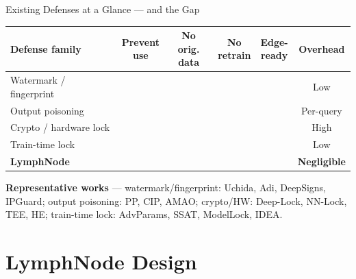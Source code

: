 \documentclass{beamer}
\newcommand{\smallgap}{\vspace{0.15cm}}
\newcommand{\cmark}{\textcolor{green!55!black}{\ding{51}}}
\newcommand{\xmark}{\textcolor{red!70!black}{\ding{55}}}
\begin{document}
\begin{frame}{Existing Defenses at a Glance --- and the Gap}
    \footnotesize
    \begin{center}
    \setlength{\tabcolsep}{6pt}\renewcommand{\arraystretch}{1.35}
    \begin{tabular}{lccccc}
        \toprule
        \textbf{Defense family} & \makecell{\textbf{Prevent}\\\textbf{use}} & \makecell{\textbf{No orig.}\\\textbf{data}} & \makecell{\textbf{No}\\\textbf{retrain}} & \makecell{\textbf{Edge-}\\\textbf{ready}} & \textbf{Overhead} \\
        \midrule
        Watermark / fingerprint & \xmark & \xmark & \xmark & \cmark & Low \\
        Output poisoning        & \cmark & \cmark & \cmark & \xmark & Per-query \\
        Crypto / hardware lock  & \cmark & \cmark & \cmark & \xmark & High \\
        Train-time lock         & \cmark & \xmark & \xmark & \cmark & Low \\
        \midrule
        \textbf{LymphNode}      & \cmark & \cmark & \cmark & \cmark & \textbf{Negligible} \\
        \bottomrule
    \end{tabular}
    \end{center}
    \smallgap
    \scriptsize \textbf{Representative works} --- watermark/fingerprint: Uchida, Adi, DeepSigns, IPGuard; output poisoning: PP, CIP, AMAO; crypto/HW: Deep-Lock, NN-Lock, TEE, HE; train-time lock: AdvParams, SSAT, ModelLock, IDEA.

\end{frame}


\section{LymphNode Design}
\end{document}
